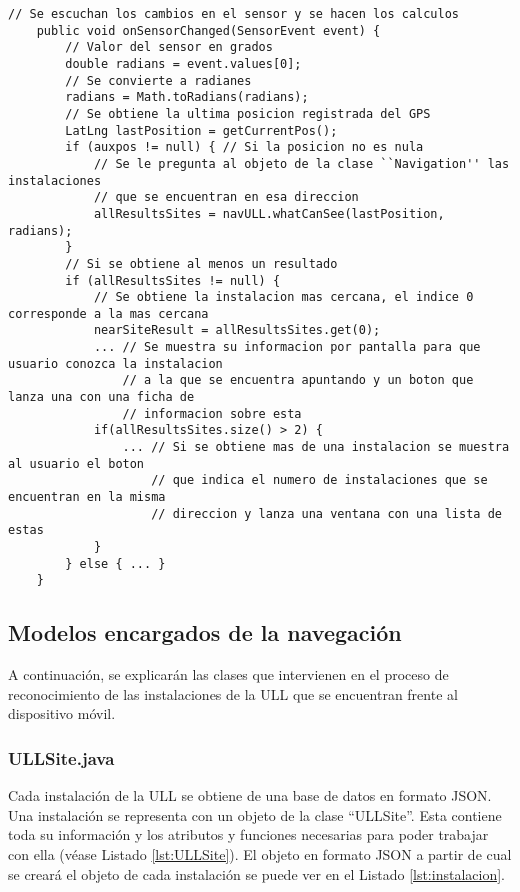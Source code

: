 \begin{minipage}{\linewidth}
\begin{lstlisting}[caption={Código que se ejecuta cada vez que se registra un cambio en el sensor que calcula la orientación.}, label={lst:orientacionL}]
    // Se escuchan los cambios en el sensor y se hacen los calculos
    public void onSensorChanged(SensorEvent event) {
        // Valor del sensor en grados
        double radians = event.values[0]; 
        // Se convierte a radianes
        radians = Math.toRadians(radians);
        // Se obtiene la ultima posicion registrada del GPS
        LatLng lastPosition = getCurrentPos();
        if (auxpos != null) { // Si la posicion no es nula
            // Se le pregunta al objeto de la clase ``Navigation'' las instalaciones 
            // que se encuentran en esa direccion
            allResultsSites = navULL.whatCanSee(lastPosition, radians);
        }
        // Si se obtiene al menos un resultado
        if (allResultsSites != null) {
            // Se obtiene la instalacion mas cercana, el indice 0 corresponde a la mas cercana
            nearSiteResult = allResultsSites.get(0);
            ... // Se muestra su informacion por pantalla para que usuario conozca la instalacion  
                // a la que se encuentra apuntando y un boton que lanza una con una ficha de 
                // informacion sobre esta
            if(allResultsSites.size() > 2) {
                ... // Si se obtiene mas de una instalacion se muestra al usuario el boton
                    // que indica el numero de instalaciones que se encuentran en la misma
                    // direccion y lanza una ventana con una lista de estas
            }
        } else { ... }
    } 
\end{lstlisting}
\end{minipage}

\subsection{Modelos encargados de la navegación}

A continuación, se explicarán las clases que intervienen en el proceso de reconocimiento de las instalaciones de la ULL que se encuentran frente al dispositivo móvil.

\subsubsection{ULLSite.java}

Cada instalación de la ULL se obtiene de una base de datos en formato JSON. Una instalación se representa con un objeto de la clase ``ULLSite''. Esta contiene toda su información y los atributos y funciones necesarias para poder trabajar con ella (véase Listado \ref{lst:ULLSite}). El objeto en formato JSON a partir de cual se creará el objeto de cada instalación se puede ver en el Listado \ref{lst:instalacion}.

